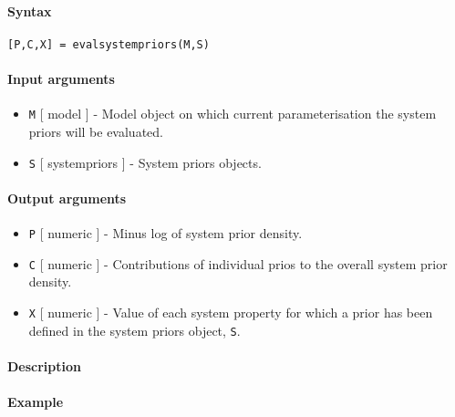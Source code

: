


	\paragraph{Syntax}\label{syntax}

\begin{verbatim}
[P,C,X] = evalsystempriors(M,S)
\end{verbatim}

\paragraph{Input arguments}\label{input-arguments}

\begin{itemize}
\item
  \texttt{M} {[} model {]} - Model object on which current
  parameterisation the system priors will be evaluated.
\item
  \texttt{S} {[} systempriors {]} - System priors objects.
\end{itemize}

\paragraph{Output arguments}\label{output-arguments}

\begin{itemize}
\item
  \texttt{P} {[} numeric {]} - Minus log of system prior density.
\item
  \texttt{C} {[} numeric {]} - Contributions of individual prios to the
  overall system prior density.
\item
  \texttt{X} {[} numeric {]} - Value of each system property for which a
  prior has been defined in the system priors object, \texttt{S}.
\end{itemize}

\paragraph{Description}\label{description}

\paragraph{Example}\label{example}


